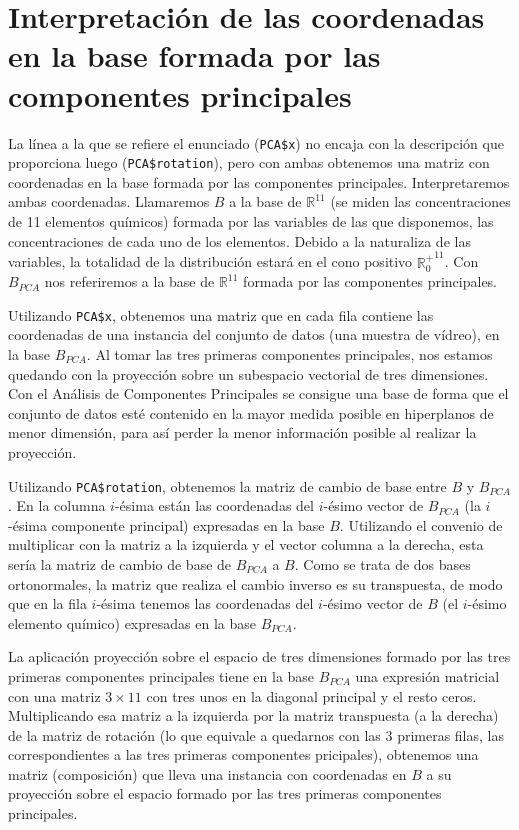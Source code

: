 \documentclass[12pt]{article}
\begin{document}
\section{Interpretación de las coordenadas en la base formada por las componentes principales}

La línea a la que se refiere el enunciado (\texttt{PCA\$x}) no encaja
con la descripción que proporciona luego (\texttt{PCA\$rotation}),
pero con ambas obtenemos una matriz con coordenadas en la base formada
por las componentes principales. Interpretaremos ambas
coordenadas. Llamaremos $B$ a la base de $\mathbb{R}^{11}$ (se miden
las concentraciones de 11 elementos químicos) formada por las
variables de las que disponemos, las concentraciones de cada uno de
los elementos. Debido a la naturaliza de las variables, la totalidad
de la distribución estará en el cono positivo ${\mathbb{R}^+_0}^{11}$.
Con $B_{PCA}$ nos referiremos a la base de $\mathbb{R}^{11}$ formada
por las componentes principales.

Utilizando \texttt{PCA\$x}, obtenemos una matriz que en cada fila
contiene las coordenadas de una instancia del conjunto de datos (una
muestra de vídreo), en la base $B_{PCA}$. Al tomar las tres primeras
componentes principales, nos estamos quedando con la proyección sobre
un subespacio vectorial de tres dimensiones. Con el Análisis de
Componentes Principales se consigue una base de forma que el conjunto
de datos esté contenido en la mayor medida posible en hiperplanos de
menor dimensión, para así perder la menor información posible al
realizar la proyección.

Utilizando \texttt{PCA\$rotation}, obtenemos la matriz de cambio de
base entre $B$ y $B_{PCA}$. En la columna $i$-ésima están las
coordenadas del $i$-ésimo vector de $B_{PCA}$ (la $i$-ésima componente
principal) expresadas en la base $B$. Utilizando el convenio de
multiplicar con la matriz a la izquierda y el vector columna a la
derecha, esta sería la matriz de cambio de base de $B_{PCA}$ a
$B$. Como se trata de dos bases ortonormales, la matriz que realiza el
cambio inverso es su transpuesta, de modo que en la fila $i$-ésima
tenemos las coordenadas del $i$-ésimo vector de $B$ (el $i$-ésimo
elemento químico) expresadas en la base $B_{PCA}$.

La aplicación proyección sobre el espacio de tres dimensiones formado
por las tres primeras componentes principales tiene en la base
$B_{PCA}$ una expresión matricial con una matriz $3\times 11$ con tres
unos en la diagonal principal y el resto ceros. Multiplicando esa
matriz a la izquierda por la matriz transpuesta (a la derecha) de la
matriz de rotación (lo que equivale a quedarnos con las 3 primeras
filas, las correspondientes a las tres primeras componentes
pricipales), obtenemos una matriz (composición) que lleva una
instancia con coordenadas en $B$ a su proyección sobre el espacio
formado por las tres primeras componentes principales.
\end{document}

